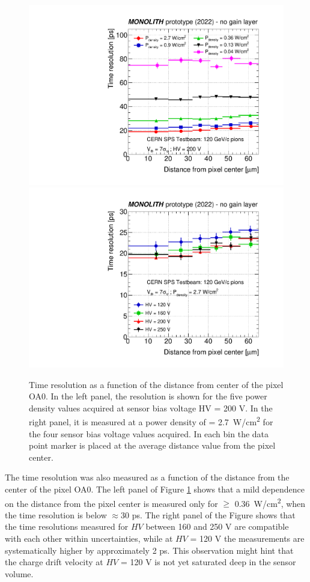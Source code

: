 		\begin{figure}[h]
			\centering %
			\includegraphics[width=.49\linewidth]{files/MONOLITH_paper/timeres_vs_radius_allWP.pdf}
			\includegraphics[width=.49\linewidth]{files/MONOLITH_paper/timeres_vs_radius_allHV.pdf}
			\caption{Time resolution as a function of the distance from center of the pixel OA0. In the left panel, the resolution is shown for the five power density values acquired at sensor bias voltage HV = 200 V. In the right panel, it is measured at a power density of \power = \SI{2.7}{\watt/\centi\meter^2} for the four sensor bias voltage values acquired. In each  bin the data point marker is placed at the average distance value from the pixel center.}
			\label{im:MONO_TOF_radius} 
		\end{figure}


		The time resolution was also measured as a function of the distance from the center of the pixel OA0. The left panel of Figure \ref{im:MONO_TOF_radius} shows that a mild dependence on the distance from the pixel center is measured only for \power $\ge$ \SI{0.36}{\watt/\centi\meter^2}, when the time resolution is below $\approx$30 ps. The right panel of the Figure shows that the time resolutions measured for $HV$ between 160 and 250 V are compatible with each other within uncertainties, while at $HV$ = 120 V the measurements are systematically higher by approximately 2 ps. This observation might hint that the charge drift velocity at $HV$ = 120 V is not yet saturated deep in the sensor volume.

